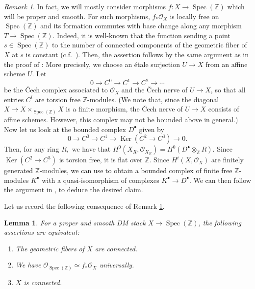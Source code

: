 \documentclass{amsart}
\newtheorem{lem}[prop]{Lemma}
\theoremstyle{definition}
\theoremstyle{remark}
\newtheorem{remark}[prop]{Remark}
\DeclareMathOperator{\Ker}{Ker}
\DeclareMathOperator{\Spec}{Spec}
\newcommand{\ZZ}{\mathbb Z}
\begin{document}
\begin{remark}\label{Remark: geometricallt connected fibers imply cohomological flatness}
In fact, we will mostly consider morphisms $f\colon X\rightarrow \Spec(\ZZ)$ which will be proper and smooth.
    For such morphisms,
    $f_{*}\mathcal{O}_{X}$ is locally free on $\Spec(\ZZ)$ and its formation commutes with base change along any morphism $T \to \Spec(\ZZ)$.
    Indeed, it is well-known that the function sending a point $s \in \Spec(\ZZ)$ to the number of connected components of the geometric fiber of $X$ at $s$ is constant (c.f.\ \cite[Theorem 4.17]{DeligneMumfordModuliCurves}).
    Then, the assertion follows by the same argument as in the proof of \cite[Chapter II, Section 5, Corollary 2]{MumfordAbelian}: More precisely, we choose an \'etale surjection $U \to X$
    from an affine scheme $U$.
    Let
    \[
    0 \to C^{0} \to C^{1} \to C^{2} \to \cdots
    \]
    be the \v{C}ech complex associated to $\mathcal{O}_{X}$ and the \v{C}ech nerve of $U \to X$, so that all entries $C^{i}$ are torsion free $\ZZ$-modules.
    (We note that, since the diagonal
    $X \to X \times_{\Spec(\ZZ)} X$ is a finite morphism,
    the \v{C}ech nerve of $U \to X$ consists of affine schemes.
    However, this complex may not be bounded above in general.)
    Now let us look at the bounded complex $D^{\bullet}$ given by
\[
0 \to C^{0} \to C^{1} \to \Ker(C^{2}\rightarrow C^{3}) \to 0.
\]
Then, for any ring $R,$ we have that
$
H^{0}(X_{R},\mathcal{O}_{X_{R}})=H^{0}(D^{\bullet}\otimes_{\ZZ}R).
$
Since $\Ker(C^{2}\rightarrow C^{3})$ is torsion free, it is flat over $\ZZ$.
Since $H^{i}(X,\mathcal{O}_{X})$ are finitely generated $\ZZ$-modules,
we can use \cite[Chapter II, Section 5, Lemma 1]{MumfordAbelian}
to obtain a bounded complex of finite free $\ZZ$-modules $K^{\bullet}$ with a quasi-isomorphism
of complexes $K^{\bullet}\rightarrow D^{\bullet}.$
We can then follow the argument in \cite[Chapter II, Section 5, Corollary 2]{MumfordAbelian}, to deduce the desired claim.
\end{remark}

Let us record the following consequence of Remark \ref{Remark: geometricallt connected fibers imply cohomological flatness}.

\begin{lem}\label{Lemma:connectedness}
    For a proper and smooth DM stack $X \to \Spec(\ZZ)$, the following assertions are equivalent:
\begin{enumerate}
    \item The geometric fibers of $X$ are connected.
    \item We have $\mathcal{O}_{\Spec(\ZZ)}\simeq f_{*}\mathcal{O}_{X}$ universally.
    \item $X$ is connected.
\end{enumerate}
\end{lem}
\end{document}
